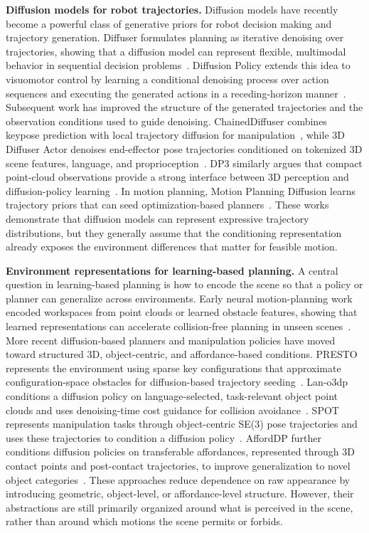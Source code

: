 \textbf{Diffusion models for robot trajectories.}
Diffusion models have recently become a powerful class of generative priors for robot decision making and trajectory generation. Diffuser formulates planning as iterative denoising over trajectories, showing that a diffusion model can represent flexible, multimodal behavior in sequential decision problems~\cite{janner2022diffuser}. Diffusion Policy extends this idea to visuomotor control by learning a conditional denoising process over action sequences and executing the generated actions in a receding-horizon manner~\cite{chi2025diffusionpolicy}. Subsequent work has improved the structure of the generated trajectories and the observation conditions used to guide denoising. ChainedDiffuser combines keypose prediction with local trajectory diffusion for manipulation~\cite{xian2023chaineddiffuser}, while 3D Diffuser Actor denoises end-effector pose trajectories conditioned on tokenized 3D scene features, language, and proprioception~\cite{ke2025threediffuseractor}. DP3 similarly argues that compact point-cloud observations provide a strong interface between 3D perception and diffusion-policy learning~\cite{ze20243d}. In motion planning, Motion Planning Diffusion learns trajectory priors that can seed optimization-based planners~\cite{carvalho2023motionplanningdiffusion}. These works demonstrate that diffusion models can represent expressive trajectory distributions, but they generally assume that the conditioning representation already exposes the environment differences that matter for feasible motion.

\textbf{Environment representations for learning-based planning.}
A central question in learning-based planning is how to encode the scene so that a policy or planner can generalize across environments. Early neural motion-planning work encoded workspaces from point clouds or learned obstacle features, showing that learned representations can accelerate collision-free planning in unseen scenes~\cite{strudel2021obstacle}. More recent diffusion-based planners and manipulation policies have moved toward structured 3D, object-centric, and affordance-based conditions. PRESTO represents the environment using sparse key configurations that approximate configuration-space obstacles for diffusion-based trajectory seeding~\cite{seo2024presto}. Lan-o3dp conditions a diffusion policy on language-selected, task-relevant object point clouds and uses denoising-time cost guidance for collision avoidance~\cite{li2024lano3dp}. SPOT represents manipulation tasks through object-centric SE(3) pose trajectories and uses these trajectories to condition a diffusion policy~\cite{hsu2025spot}. AffordDP further conditions diffusion policies on transferable affordances, represented through 3D contact points and post-contact trajectories, to improve generalization to novel object categories~\cite{wu2025afforddp}. These approaches reduce dependence on raw appearance by introducing geometric, object-level, or affordance-level structure. However, their abstractions are still primarily organized around what is perceived in the scene, rather than around which motions the scene permits or forbids.

